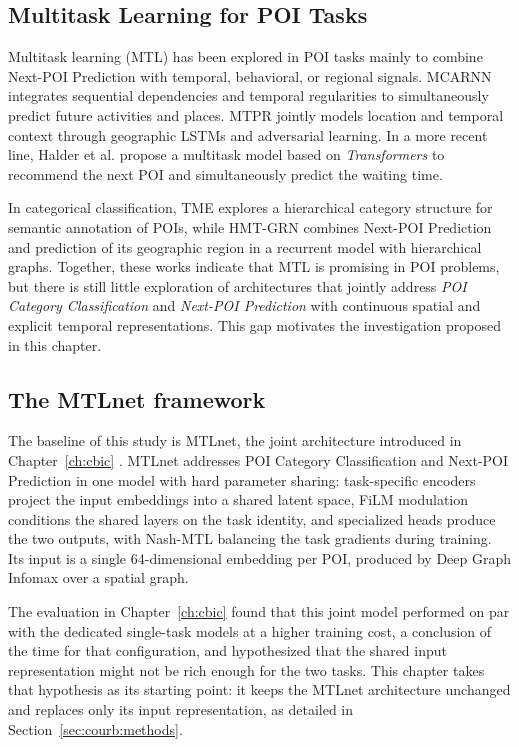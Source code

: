 \subsection{Multitask Learning for POI Tasks}

Multitask learning (MTL) \cite{caruana1997multitask} has been explored in POI tasks mainly to combine Next-POI Prediction with temporal, behavioral, or regional signals. MCARNN \cite{Liao2018} integrates sequential dependencies and temporal regularities to simultaneously predict future activities and places. MTPR \cite{Xia2020} jointly models location and temporal context through geographic LSTMs and adversarial learning. In a more recent line, Halder et al. \cite{Halder2022} propose a multitask model based on \textit{Transformers} to recommend the next POI and simultaneously predict the waiting time.

In categorical classification, TME \cite{Xu2023} explores a hierarchical category structure for semantic annotation of POIs, while HMT-GRN \cite{Lim2022} combines Next-POI Prediction and prediction of its geographic region in a recurrent model with hierarchical graphs. Together, these works indicate that MTL is promising in POI problems, but there is still little exploration of architectures that jointly address \textit{POI Category Classification} and \textit{Next-POI Prediction} with continuous spatial and explicit temporal representations. This gap motivates the investigation proposed in this chapter.

\subsection{The MTLnet framework}
\label{sec:courb:mtlnet-recap}

The baseline of this study is MTLnet, the joint architecture introduced in Chapter~\ref{ch:cbic} \cite{silva2025mtlnet}. MTLnet addresses POI Category Classification and Next-POI Prediction in one model with hard parameter sharing: task-specific encoders project the input embeddings into a shared latent space, FiLM modulation conditions the shared layers on the task identity, and specialized heads produce the two outputs, with Nash-MTL balancing the task gradients during training. Its input is a single 64-dimensional embedding per POI, produced by Deep Graph Infomax over a spatial graph.

The evaluation in Chapter~\ref{ch:cbic} found that this joint model performed on par with the dedicated single-task models at a higher training cost, a conclusion of the time for that configuration, and hypothesized that the shared input representation might not be rich enough for the two tasks. This chapter takes that hypothesis as its starting point: it keeps the MTLnet architecture unchanged and replaces only its input representation, as detailed in Section~\ref{sec:courb:methods}.
